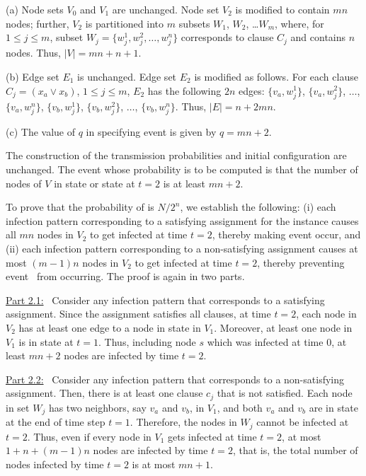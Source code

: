 \begin{description}
\item{(a)} Node sets $V_0$ and $V_1$ are unchanged.
Node set $V_2$ is modified to contain $mn$ nodes; further, 
$V_2$ is partitioned into $m$ subsets $W_1$, $W_2$, \ldots $W_m$,
where, for $1 \leq j \leq m$, subset $W_j = \{w_j^1, w_j^2, \ldots, w_j^n\}$ 
corresponds to clause $C_j$ and contains $n$ nodes.
Thus, $|V| = mn+n+1$.

\item{(b)} Edge set $E_1$ is unchanged. Edge set $E_2$ is modified as follows.
For each clause $C_j = (x_a \vee x_b)$, $1 \leq j \leq m$,
$E_2$ has the following $2n$ edges: 
$\{v_a, w_j^1\}$, $\{v_a, w_j^2\}$, $\ldots$, $\{v_a, w_j^n\}$, 
$\{v_b, w_j^1\}$, $\{v_b, w_j^2\}$, $\ldots$, $\{v_b, w_j^n\}$.
Thus, $|E| = n+2mn$.

\item{(c)} The value of $q$ in specifying event \cale{} is 
given by $q = mn + 2$.
\end{description}

\noindent
The construction of the transmission probabilities and initial
configuration are unchanged.
The event \cale{} whose probability is to be computed 
is that the number of nodes of $V$ in state \istate{} or 
state \rstate{} at $t = 2$ is at least $mn + 2$.  

To prove that the probability of \cale{} is $N/2^n$,
we establish the following: (i) each infection pattern 
corresponding to a satisfying
assignment for the \mtsat{} instance causes 
all $mn$ nodes in $V_2$
to get infected at time $t = 2$, thereby making event \cale{} occur, 
and (ii) each infection pattern corresponding to a non-satisfying assignment 
causes at most $(m-1)n$  nodes in $V_2$
to get infected at time $t = 2$, 
thereby preventing event \cale{} ~from occurring.
The proof is again in two parts.

\noindent
\underline{Part 2.1:}~
Consider any infection pattern that corresponds to a
satisfying assignment.
Since the assignment satisfies all clauses, at time $t = 2$,
each node in $V_2$ has at least one edge to a node 
in state \istate{} in $V_1$.
Moreover, at least one node in $V_1$ is in state \istate{}  at $t = 1$. 
Thus, including node $s$ which was infected at time 0,
at least $mn+2$ nodes are infected by time $t = 2$.  

\noindent
\underline{Part 2.2:}~
Consider any infection pattern that corresponds to a
non-satisfying assignment.
Then, there is at least one clause $c_j$ that is not satisfied.
Each node in set $W_j$ has two neighbors, say $v_a$ and $v_b$,
in $V_1$, and both $v_a$ and $v_b$ are in state \sstate{} at the 
end of time step $t = 1$.
Therefore, the nodes in $W_j $ cannot be infected at $t = 2$.
Thus, even if every node in $V_1$ gets infected at time $t = 2$,
at most $1 + n + (m-1)n$ nodes are infected by  time $t = 2$,
that is, the total number of nodes infected  by  time $t = 2$ 
is at most $mn+1$.

